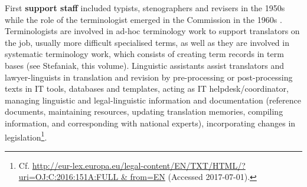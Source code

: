 \documentclass[output=paper]{langsci/langscibook}
\begin{document}
First \textbf{support staff} included typists, stenographers and revisers in the 1950s while the role of the terminologist emerged in the Commission in the 1960s \citep[12, 21]{European2010}. Terminologists are involved in ad-hoc terminology work to support translators on the job, usually more difficult specialised terms, as well as they are involved in systematic terminology work, which consists of creating term records in term bases (see Stefaniak, this volume). Linguistic assistants assist translators and lawyer-linguists in translation and revision by pre-processing or post-processing texts in IT tools, databases and templates, acting as IT helpdesk/coordinator, managing linguistic and legal-linguistic information and documentation (reference documents, maintaining resources, updating translation memories, compiling information, and corresponding with national experts), incorporating changes in legislation\footnote{Cf. \url{http://eur-lex.europa.eu/legal-content/EN/TXT/HTML/?uri=OJ:C:2016:151A:FULL & from=EN} (Accessed 2017-07-01).}.
\end{document}
